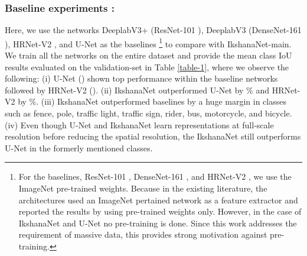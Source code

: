 \documentclass{article}
\begin{document}
\subsubsection{Baseline experiments :}
\label{4.2.1}
Here, we use the networks DeeplabV3+ (ResNet-101 \cite{he2016deep}), DeeplabV3 (DenseNet-161 \cite{huang2017densely}), HRNet-V2 \cite{SunZJCXLMWLW19}, and U-Net \cite{ronneberger2015u} as the baselines \footnote{ For the baselines, ResNet-101 \cite{he2016deep}, DenseNet-161 \cite{huang2017densely}, and HRNet-V2 \cite{SunZJCXLMWLW19}, we use the ImageNet \cite{deng2009imagenet} pre-trained weights. Because in the existing literature, the architectures \cite{chen2018encoder,zhao2017pyramid,10.1007/978-3-030-58539-6_11,SunZJCXLMWLW19} used an ImageNet pertained network as a feature extractor and reported the results by using pre-trained weights only. However, in the case of IkshanaNet and U-Net \cite{ronneberger2015u} no pre-training is done. Since this work addresses the requirement of massive data, this provides strong motivation against pre-training.} to compare with IkshanaNet-main.\newline
We train all the networks on the entire dataset  and provide the mean class IoU results evaluated on the validation-set in Table \ref{table-1}, where we observe the following: \newline
(i) U-Net \cite{ronneberger2015u} () shown top performance within the baseline networks followed by  HRNet-V2 \cite{SunZJCXLMWLW19} ().\newline
(ii) IkshanaNet outperformed U-Net by  \% and HRNet-V2 \cite{SunZJCXLMWLW19} by  \%.\newline
(iii) IkshanaNet outperformed baselines by a huge margin in classes such as fence, pole, traffic light, traffic sign, rider, bus, motorcycle, and bicycle.\newline
(iv) Even though U-Net \cite{ronneberger2015u} and IkshanaNet learn representations at full-scale resolution before reducing the spatial resolution, the IkshanaNet still outperforms U-Net \cite{ronneberger2015u} in the formerly mentioned classes.
\end{document}
